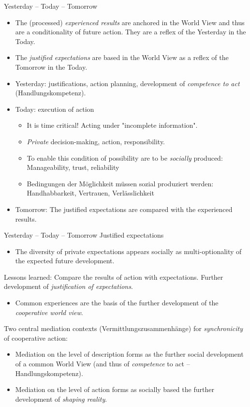 \documentclass{beamer}
\begin{document}
\begin{frame}{Yesterday -- Today -- Tomorrow}
\begin{itemize}
\item The (processed) \emph{experienced results} are anchored in the World
  View and thus are a conditionality of future action.  They are a reflex of
  the Yesterday in the Today.
\item The \emph{justified expectations} are based in the World View as a
  reflex of the Tomorrow in the Today.
\item Yesterday: justifications, action planning, development of
  \emph{competence to act} (Handlungskompetenz).
\item Today: execution of action 
  \begin{itemize}
  \item It is time critical! Acting under "incomplete information".
  \item \emph{Private} decision-making, action, responsibility.
  \item To enable this condition of possibility are to be \emph{socially}
    produced: Manageability, trust, reliability
  \item Bedingungen der Möglichkeit müssen sozial produziert werden:
    Handhabbarkeit, Vertrauen, Verlässlichkeit
  \end{itemize}
\item Tomorrow: The justified expectations are compared with the experienced
  results.
\end{itemize}
\end{frame}

\begin{frame}{Yesterday -- Today -- Tomorrow}
Justified expectations\vspace{-1em}
\begin{itemize}
\item The diversity of private expectations appears socially as
  multi-optionality of the expected future development.
\end{itemize}\vspace{-1em}
Lessons learned: Compare the results of action with expectations.  Further
development of \emph{justification of expectations}.
\begin{itemize}\vspace{-1em}
\item Common experiences are the basis of the further development of the
  \emph{cooperative world view}.
\end{itemize}\vspace{-1em}
Two central mediation contexts (Vermittlungszusammenhänge) for
\emph{synchronicity} of cooperative action:
\begin{itemize}\vspace{-1em}
\item Mediation on the level of description forms as the further social
  development of a common World View (and thus of \emph{competence} to act --
  Handlungskompetenz).
\item Mediation on the level of action forms as socially based the further
  development of \emph{shaping reality}.
\end{itemize}
\end{frame}
\end{document}
